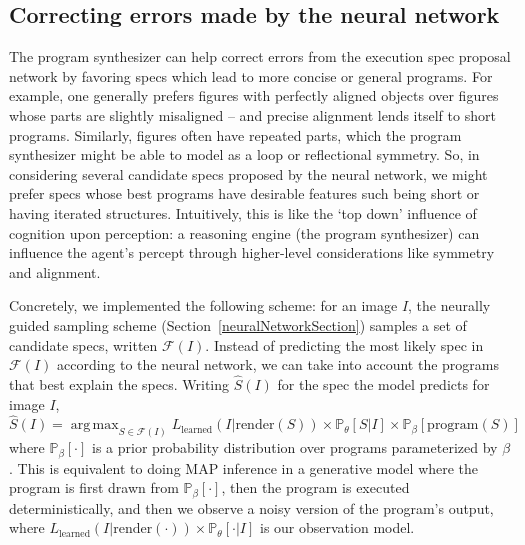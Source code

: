 \documentclass{article}
\DeclareMathOperator*{\argmax}{arg\,max} %
\newcommand{\probability}{\mathds{P}} %
\theoremstyle{definition}
\begin{document}
\subsection{Correcting errors made by the neural network}\label{synthesizerHelpsParsing}
The program synthesizer can help correct errors from the execution spec proposal network by favoring  specs which lead to more concise or general programs.
For example, one generally prefers figures with perfectly aligned objects over figures whose parts are slightly misaligned -- and precise alignment lends itself to short programs.
Similarly, figures often have repeated parts,
which the program synthesizer might be able to model as a loop or reflectional symmetry.
So, in considering several candidate specs proposed by the neural network,
we might prefer specs whose best programs have desirable features such being short or having iterated structures.
Intuitively,
this is like the `top down' influence of cognition upon perception:
a reasoning engine (the program synthesizer)
can influence the agent's percept
through higher-level considerations  like symmetry and alignment.



Concretely, we implemented the following scheme: for an image $I$, the neurally guided sampling scheme (Section~\ref{neuralNetworkSection}) samples a set of candidate specs, written $\mathcal{F}(I)$.
Instead of predicting the most likely spec in $\mathcal{F}(I)$ according to the neural network,
we can take into account the programs that best explain the specs. 
Writing $\hat{S}(I)$ for the spec the model predicts for image $I$,
\begin{equation}
\hat{S}(I) = \argmax_{S\in \mathcal{F}(I)} L_{\text{learned}}(I | \text{render}(S))\times \probability_\theta[S|I] \times\probability_{\beta} [ \text{program}(S)] 
\end{equation}
where $\probability_{\beta} [\cdot]$ is a prior probability
distribution over programs parameterized by $\beta$.
This is equivalent to doing
MAP inference in a generative model where the program is first drawn
from $\probability_{\beta} [\cdot]$, then the program is executed deterministically,
and then we observe a noisy version of the program's output, where $L_\text{learned}(I|\text{render}(\cdot))\times\probability_\theta[\cdot|I]$
is our observation model.
\end{document}

